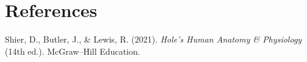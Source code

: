 \section*{References}
Shier, D., Butler, J., \& Lewis, R. (2021). \textit{Hole’s Human Anatomy \& Physiology} (14th ed.). McGraw–Hill Education.
